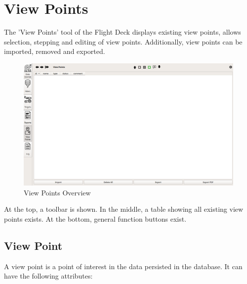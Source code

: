 
\section{View Points}
\label{sec:view_points} 

The 'View Points' tool of the Flight Deck displays existing view points, allows selection, stepping and editing of view points. 
Additionally, view points can be imported, removed and exported.

\begin{figure}[H]
    \hspace*{-2.5cm}
    \includegraphics[width=19cm]{figures/view_points.png}
  \caption{View Points Overview}
\end{figure}

At the top, a toolbar is shown. In the middle, a table showing all existing view points exists. At the bottom, general function buttons exist. \\

\subsection{View Point}

A view point is a point of interest in the data persisted in the database. It can have the following attributes:

